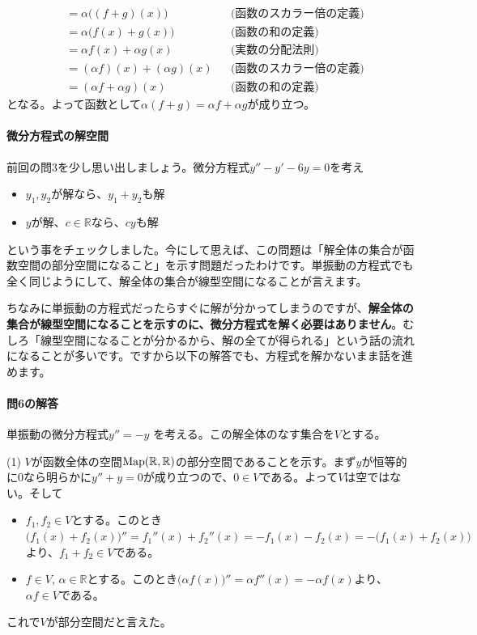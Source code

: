 \begin{itemize}
\begin{itemize}
\begin{align*}
&= \alpha\bigl((f + g)(x)\bigr) & & \text{(函数のスカラー倍の定義)} \\
&= \alpha\bigl(f(x) + g(x)\bigr) & & \text{(函数の和の定義)} \\
&= \alpha f(x) + \alpha g(x) & & \text{(実数の分配法則)} \\
&= (\alpha f)(x) + (\alpha g)(x) & & \text{(函数のスカラー倍の定義)} \\
&= (\alpha f + \alpha g)(x) & & \text{(函数の和の定義)}
\end{align*}
となる。よって函数として$\alpha(f + g) = \alpha f + \alpha g$が成り立つ。
\end{itemize}
\end{itemize}

\paragraph{微分方程式の解空間}

前回の問$3$を少し思い出しましょう。微分方程式$y'' - y' - 6y = 0$を考え
\begin{itemize}
\item $y_1, y_2$が解なら、$y_1 + y_2$も解
\item $y$が解、$c\in\mathbb{R}$なら、$cy$も解
\end{itemize}
という事をチェックしました。今にして思えば、この問題は「解全体の集合が函数空間の部分空間になること」を示す問題だったわけです。単振動の方程式でも全く同じようにして、解全体の集合が線型空間になることが言えます。

ちなみに単振動の方程式だったらすぐに解が分かってしまうのですが、\textbf{解全体の集合が線型空間になることを示すのに、微分方程式を解く必要はありません}。むしろ「線型空間になることが分かるから、解の全てが得られる」という話の流れになることが多いです。ですから以下の解答でも、方程式を解かないまま話を進めます。

\paragraph{問6の解答} 単振動の微分方程式$y'' = -y$ を考える。この解全体のなす集合を$V$とする。

\noindent (1) $V$が函数全体の空間$\operatorname{Map}(\mathbb{R}, \mathbb{R})$の部分空間であることを示す。まず$y$が恒等的に$0$なら明らかに$y'' + y = 0$が成り立つので、$0\in V$である。よって$V$は空ではない。そして
\begin{itemize}
\item $f_1, f_2 \in V$とする。このとき$\bigl(f_1(x) + f_2(x)\bigr)'' = f_1''(x) + f_2''(x) = -f_1(x) - f_2(x) = -\bigl(f_1(x) + f_2(x)\bigr)$より、$f_1 + f_2 \in V$である。
\item $f \in V$, $\alpha\in\mathbb{R}$とする。このとき$\bigl(\alpha f(x)\bigr)'' = \alpha f''(x) = -\alpha f(x)$より、$\alpha f \in V$である。
\end{itemize}
これで$V$が部分空間だと言えた。

